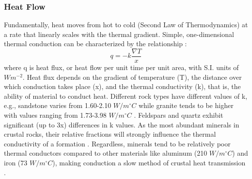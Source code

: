 \subsubsection{Heat Flow}
Fundamentally, heat moves from hot to cold (Second Law of Thermodynamics) at a rate that linearly scales with the thermal gradient. Simple, one-dimensional thermal conduction can be characterized by the relationship \citep[~p. 270]{fowler_solid_2005}:
\begin{equation}\label{eq:conduction}
q = -k \frac{\nabla T}{x}
\end{equation}
where q is heat flux, or heat flow per unit time per unit area, with S.I. units of \(Wm^{-2}\). Heat flux depends on the gradient of temperature (T), the distance over which conduction takes place (x), and the thermal conductivity (k), that is, the ability of material to conduct heat. Different rock types have different values of k, e.g., sandstone varies from 1.60-2.10 \(W/m^\circ C\) while granite tends to be higher with values ranging from 1.73-3.98 \(W/m^\circ C\) \citep[~p. 30]{dipippo_geothermal_2012}. Feldspars and quartz exhibit significant (up to 3x) differences in k values. As the most abundant minerals in crustal rocks, their relative fractions will strongly influence the thermal conductivity of a formation \citep[~p. 22]{glassley_geothermal_2015}. Regardless, minerals tend to be relatively poor thermal conductors compared to other materials like aluminum (210 \(W/m^\circ C\)) and iron (73 \(W/m^\circ C\)), making conduction a slow method of crustal heat transmission \citep[~p. 23]{dipippo_geothermal_2012}.

